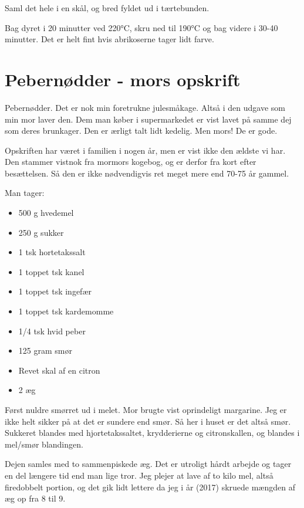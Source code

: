 \documentclass[
  letterpaper,
  DIV=11,
  numbers=noendperiod]{scrreprt}
\providecommand{\tightlist}{%
  \setlength{\itemsep}{0pt}\setlength{\parskip}{0pt}}\usepackage{longtable,booktabs,array}
\begin{document}
Saml det hele i en skål, og bred fyldet ud i tærtebunden.

Bag dyret i 20 minutter ved 220°C, skru ned til 190°C og bag videre i
30-40 minutter. Det er helt fint hvis abrikoserne tager lidt farve.

\hypertarget{pebernuxf8dder---mors-opskrift-1}{%
\section{Pebernødder - mors
opskrift}\label{pebernuxf8dder---mors-opskrift-1}}

Pebernødder. Det er nok min foretrukne julesmåkage. Altså i den udgave
som min mor laver den. Dem man køber i supermarkedet er vist lavet på
samme dej som deres brunkager. Den er ærligt talt lidt kedelig. Men
mors! De er gode.

Opskriften har været i familien i nogen år, men er vist ikke den ældste
vi har. Den stammer vistnok fra mormors kogebog, og er derfor fra kort
efter besættelsen. Så den er ikke nødvendigvis ret meget mere end 70-75
år gammel.

Man tager:

\begin{itemize}
\tightlist
\item
  500 g hvedemel
\item
  250 g sukker
\item
  1 tsk hortetakssalt
\item
  1 toppet tsk kanel
\item
  1 toppet tsk ingefær
\item
  1 toppet tsk kardemomme
\item
  1/4 tsk hvid peber
\item
  125 gram smør
\item
  Revet skal af en citron
\item
  2 æg
\end{itemize}

Først nuldre smørret ud i melet. Mor brugte vist oprindeligt margarine.
Jeg er ikke helt sikker på at det er sundere end smør. Så her i huset er
det altså smør. Sukkeret blandes med hjortetakssaltet, krydderierne og
citronskallen, og blandes i mel/smør blandingen.

Dejen samles med to sammenpiskede æg. Det er utroligt hårdt arbejde og
tager en del længere tid end man lige tror. Jeg plejer at lave af to
kilo mel, altså firedobbelt portion, og det gik lidt lettere da jeg i år
(2017) skruede mængden af æg op fra 8 til 9.
\end{document}
